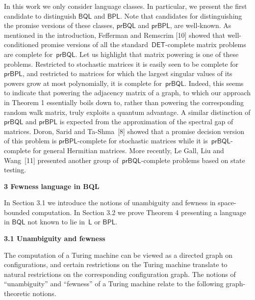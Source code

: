\documentclass[10pt,a4paper]{article}
\begin{document}
In this work we only consider language classes. In particular, we present the first candidate to distinguish $\mathsf{BQL}$ and $\mathsf{BPL}$. Note that candidates for distinguishing the promise versions of these classes, $\mathsf{prBQL}$ and $\mathsf{prBPL}$, are well-known.
As mentioned in the introduction, Fefferman and Remscrim [10] showed that well-conditioned promise versions of all the standard $\mathsf{DET}$-complete matrix problems are complete for $\mathsf{prBQL}$.
Let us highlight that matrix powering is one of these problems. Restricted to stochastic matrices it is easily seen to be complete for $\mathsf{prBPL}$, and restricted to matrices for which the largest singular values of its powers grow at most polynomially, it is complete for $\mathsf{prBQL}$.
Indeed, this seems to indicate that powering the adjacency matrix of a graph, to which our approach in Theorem 1 essentially boils down to, rather than powering the corresponding random walk matrix, truly exploits a quantum advantage.
A similar distinction of $\mathsf{prBQL}$ and $\mathsf{prBPL}$ is expected from the approximation of the spectral gap of matrices. Doron, Sarid and Ta-Shma [8] showed that a promise decision version of this problem is $\mathsf{prBPL}$-complete for stochastic matrices while it is $\mathsf{prBQL}$-complete for general Hermitian matrices.
More recently, Le Gall, Liu and Wang [11] presented another group of $\mathsf{prBQL}$-complete problems based on state testing.\par






\par\medskip\noindent\textbf{
3 Fewness language in BQL
}\par




In Section 3.1 we introduce the notions of unambiguity and fewness in space-bounded computation.
In Section 3.2 we prove Theorem 4 presenting a language in $\mathsf{BQL}$ not known to lie in $\mathsf{L}$ or $\mathsf{BPL}$.\par




\par\medskip\noindent\textbf{
3.1 Unambiguity and fewness}\par




The computation of a Turing machine can be viewed as a directed graph on configurations, and certain restrictions on the Turing machine translate to natural restrictions on the corresponding configuration graph.
The notions of “unambiguity” and “fewness” of a Turing machine relate to the following graph-theoretic notions.\par
\end{document}
